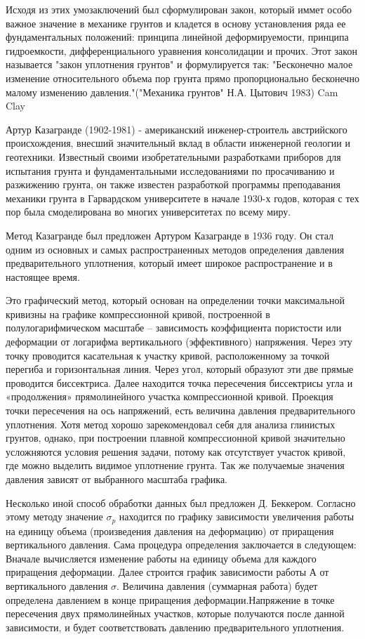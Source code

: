  Исходя из этих умозаключений был сформулирован закон, который иммет особо важное значение в механике грунтов и кладется в основу установления ряда ее фундаментальных положений: принципа линейной деформируемости, принципа гидроемкости, дифференциального уравнения консолидации и прочих. Этот закон называется "закон уплотнения грунтов" и формулируется так: "Бесконечно малое изменение относительного объема пор грунта прямо пропорционально бесконечно малому изменению давления."("Механика грунтов" Н.А. Цытович 1983)
 Cam Clay


 
 Артур Казагранде (1902-1981) - американский инженер-строитель австрийского происхождения, внесший значительный вклад в области инженерной геологии и геотехники. Известный своими изобретательными разработками приборов для испытания грунта и фундаментальными исследованиями по просачиванию и разжижению грунта, он также известен разработкой программы преподавания механики грунта в Гарвардском университете в начале 1930-х годов, которая с тех пор была смоделирована во многих университетах по всему миру. 
 
 Метод Казагранде был предложен Артуром Казагранде в 1936 году. Он стал одним из основных и самых распространенных методов определения давления предварительного уплотнения, который имеет широкое распространение и в настоящее время. 
 
  Это графический метод, который основан на определении точки максимальной кривизны на графике компрессионной кривой, построенной в полулогарифмическом масштабе – зависимость коэффициента пористости или деформации от логарифма вертикального (эффективного) напряжения. Через эту точку проводится касательная к участку кривой, расположенному за точкой перегиба и горизонтальная линия. Через угол, который образуют эти две прямые проводится биссектриса. Далее находится точка пересечения биссектрисы угла и «продолжения» прямолинейного участка компрессионной кривой. Проекция точки пересечения на ось напряжений, есть величина давления предварительного уплотнения. Хотя метод хорошо зарекомендовал себя для анализа глинистых грунтов, однако, при построении плавной компрессионной кривой значительно усложняются условия решения задачи, потому как отсутствует участок кривой, где можно выделить видимое уплотнение грунта. Так же получаемые значения давления зависят от выбранного масштаба графика. 
  
  Несколько иной способ обработки данных был предложен Д. Беккером. Согласно этому методу значение $\sigma_p$ находится по графику зависимости увеличения работы на единицу объема (произведения давления на деформацию) от приращения вертикального давления. Сама процедура определения заключается в следующем: Вначале вычисляется изменение работы на единицу объема для каждого приращения деформации. Далее строится график зависимости работы А от вертикального давления $\sigma$. Величина давления (суммарная работа)  будет определена давлением в конце приращения деформации.Напряжение в точке пересечения двух прямолинейных участков, которые получаются после данной зависимости, и будет соответствовать давлению предварительного уплотнения.
  

